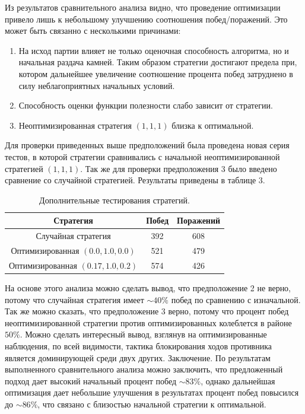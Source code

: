 \documentclass[11pt]{article}
\begin{document}
Из результатов сравнительного анализа видно, что проведение оптимизации привело лишь к небольшому улучшению соотношения побед/поражений. Это может быть связанно с несколькими причинами: 
\begin{enumerate}
    \item На исход партии влияет не только оценочная способность алгоритма, но и начальная раздача камней. Таким образом стратегии достигают предела при, котором дальнейшее увеличение соотношение процента побед затруднено в силу неблагоприятных начальных условий.
    \item Способность оценки функции полезности слабо зависит от стратегии.
    \item Неоптимизированная стратегия $(1, 1, 1)$ близка к оптимальной.
\end{enumerate}
 Для проверки приведенных выше предположений была проведена новая серия тестов, в которой стратегии сравнивались с начальной неоптимизированной стратегией $(1,1,1)$. Так же для проверки предположения 3 было введено сравнение со случайной стратегией. Результаты приведены в таблице 3.

\begin{table}[h!]
\begin{center}\caption{Дополнительные тестирования стратегий.}
\begin{tabular}{|c|c|c|}\hline
    Стратегия & Побед & Поражений  \\ \hline 
    Случайная стратегия & 392 & 608 \\ \hline
    Оптимизированная $(0.0, 1.0, 0.0)$ & 521 & 479 \\ \hline
    Оптимизированная $(0.17, 1.0, 0.2)$ & 574 & 426 \\ \hline
\end{tabular}\label{tab:extended testing of strategy}
\end{center}\end{table}

На основе этого анализа можно сделать вывод, что предположение 2 не верно, потому что случайная стратегия имеет $\sim40\%$ побед по сравнению с изначальной. Так же можно сказать, что предположение 3 верно, потому что процент побед неоптимизированной стратегии против оптимизированных колеблется в районе $50\%$. 
Можно сделать интересный вывод, взглянув на оптимизированные наблюдения, по всей видимости, тактика блокирования ходов противника является доминирующей среди двух других.
Заключение. По результатам выполненного сравнительного анализа можно заключить, что предложенный подход дает высокий начальный процент побед $\sim83\%$, однако дальнейшая оптимизация дает небольшие улучшения в результатах процент побед повысился до $\sim86\%$, что связано с близостью начальной стратегии к оптимальной.
\end{document}

